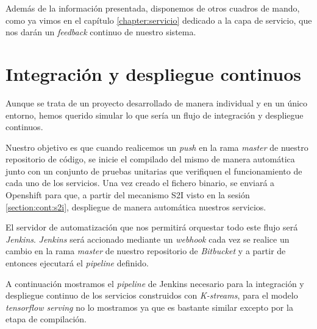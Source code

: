 Además de la información presentada, disponemos de otros cuadros de mando, como ya vimos en el capítulo \ref{chapter:servicio} dedicado a la capa de servicio, que nos darán un \textit{feedback} continuo de nuestro sistema.


\section{Integración y despliegue continuos}
\label{section:mant:cicd}

Aunque se trata de un proyecto desarrollado de manera individual y en un único entorno, hemos querido simular lo que sería un flujo de integración y despliegue continuos.

Nuestro objetivo es que cuando realicemos un \textit{push} en la rama \textit{master} de nuestro repositorio de código, se inicie el compilado del mismo de manera automática junto con un conjunto de pruebas unitarias que verifiquen el funcionamiento de cada uno de los servicios. Una vez creado el fichero binario, se enviará a Openshift para que, a partir del mecanismo S2I visto en la sesión \ref{section:cont:s2i}, despliegue de manera automática nuestros servicios.

El servidor de automatización que nos permitirá orquestar todo este flujo será \textit{Jenkins}. \textit{Jenkins} será accionado mediante un \textit{webhook} cada vez se realice un cambio en la rama \textit{master} de nuestro repositorio de \textit{Bitbucket} y a partir de entonces ejecutará el \textit{pipeline} definido.

A continuación mostramos el \textit{pipeline} de Jenkins necesario para la integración y despliegue continuo de los servicios construidos con \textit{K-streams}, para el modelo \textit{tensorflow serving} no lo mostramos ya que es bastante similar excepto por la etapa de compilación.

